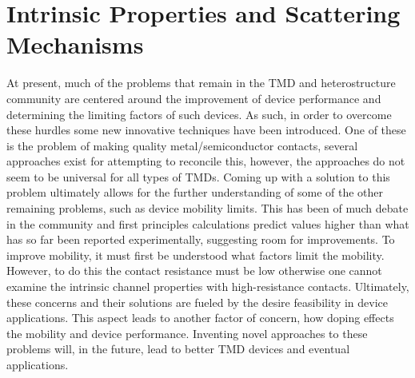 \chapter{Intrinsic Properties and Scattering Mechanisms}\label{chap:results}
At present, much of the problems that remain in the \acs{TMD} and heterostructure community are centered around the improvement of device performance and determining the limiting factors of such devices. As such, in order to overcome these hurdles some new innovative techniques have been introduced. One of these is the problem of making quality metal/semiconductor contacts, several approaches exist for attempting to reconcile this, however, the approaches do not seem to be universal for all types of \acp{TMD}. Coming up with a solution to this problem ultimately allows for the further understanding of some of the other remaining problems, such as device mobility limits. This has been of much debate in the community and first principles calculations predict values higher than what has so far been reported experimentally, suggesting room for improvements. To improve mobility, it must first be understood what factors limit the mobility. However, to do this the contact resistance must be low otherwise one cannot examine the intrinsic channel properties with high-resistance contacts. Ultimately, these concerns and their solutions are fueled by the desire feasibility in device applications. This aspect leads to another factor of concern, how doping effects the mobility and device performance. Inventing novel approaches to these problems will, in the future, lead to better \acs{TMD} devices and eventual applications.


